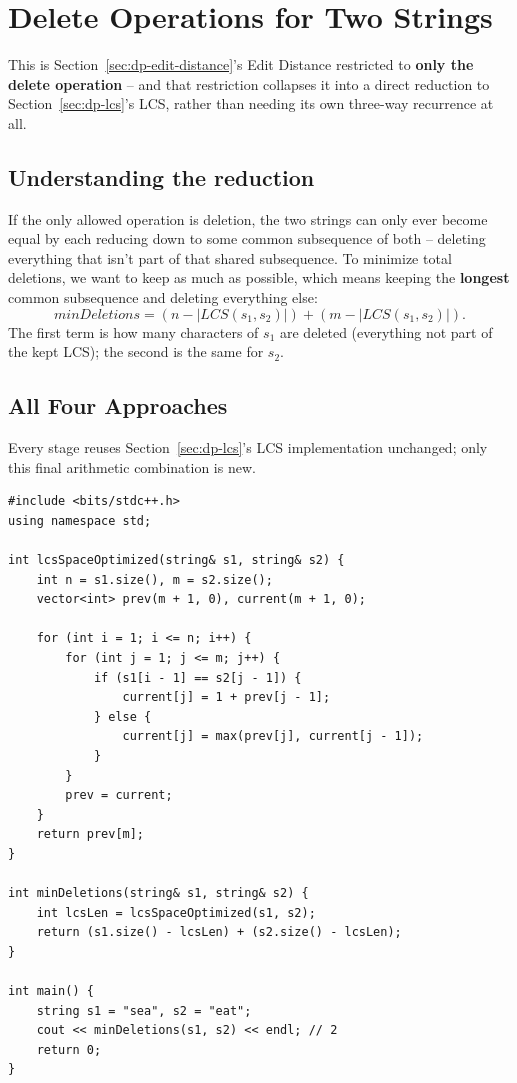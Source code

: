 \section{Delete Operations for Two Strings}
\label{sec:dp-delete-operations}


\begin{patternbox}
This is Section~\ref{sec:dp-edit-distance}'s Edit Distance restricted to
\textbf{only the delete operation} -- and that restriction collapses it
into a direct reduction to Section~\ref{sec:dp-lcs}'s LCS, rather than
needing its own three-way recurrence at all.
\end{patternbox}

\subsection*{Understanding the reduction}

If the only allowed operation is deletion, the two strings can only ever
become equal by each reducing down to some common subsequence of both --
deleting everything that isn't part of that shared subsequence. To
minimize total deletions, we want to keep as much as possible, which
means keeping the \textbf{longest} common subsequence and deleting
everything else:
\[
  \textit{minDeletions} = (n - |\textit{LCS}(s_1,s_2)|) + (m -
  |\textit{LCS}(s_1,s_2)|).
\]
The first term is how many characters of $s_1$ are deleted (everything
not part of the kept LCS); the second is the same for $s_2$.

\subsection*{All Four Approaches}

Every stage reuses Section~\ref{sec:dp-lcs}'s LCS implementation
unchanged; only this final arithmetic combination is new.

\begin{lstlisting}
#include <bits/stdc++.h>
using namespace std;

int lcsSpaceOptimized(string& s1, string& s2) {
    int n = s1.size(), m = s2.size();
    vector<int> prev(m + 1, 0), current(m + 1, 0);

    for (int i = 1; i <= n; i++) {
        for (int j = 1; j <= m; j++) {
            if (s1[i - 1] == s2[j - 1]) {
                current[j] = 1 + prev[j - 1];
            } else {
                current[j] = max(prev[j], current[j - 1]);
            }
        }
        prev = current;
    }
    return prev[m];
}

int minDeletions(string& s1, string& s2) {
    int lcsLen = lcsSpaceOptimized(s1, s2);
    return (s1.size() - lcsLen) + (s2.size() - lcsLen);
}

int main() {
    string s1 = "sea", s2 = "eat";
    cout << minDeletions(s1, s2) << endl; // 2
    return 0;
}
\end{lstlisting}

